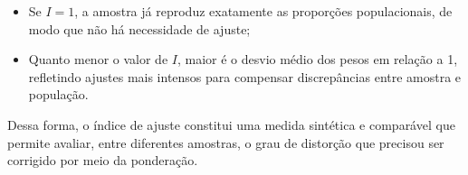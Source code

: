 \begin{itemize}
    \item Se $I = 1$, a amostra já reproduz exatamente as proporções populacionais, de modo que não há necessidade de ajuste;
    \item Quanto menor o valor de $I$, maior é o desvio médio dos pesos em relação a 1, refletindo ajustes mais intensos para compensar discrepâncias entre amostra e população.
\end{itemize}

Dessa forma, o índice de ajuste constitui uma medida sintética e comparável que permite avaliar, entre diferentes amostras, o grau de distorção que precisou ser corrigido por meio da ponderação.


